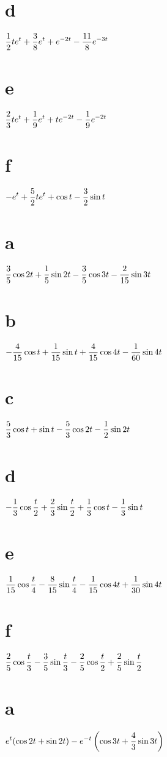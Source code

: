 \part{d}  $\displaystyle{\frac{1}{2}te^t+\frac{3}{8}e^t+e^{-2t}
-\frac{11}{8}e^{-3t}}$
\part{e}  $\displaystyle{\frac{2}{3}te^t+\frac{1}{9}e^t
+te^{-2t}-\frac{1}{9}e^{-2t}}$
\part{f}
$\displaystyle{-e^t+\frac{5}{2}te^t+\cos t-\frac{3}{2}\sin t}$

\;
 \part{a} $\displaystyle{\frac{3}{5}\cos 2t+\frac{1}{5}\sin 2t
-\frac{3}{5}\cos 3t-\frac{2}{15}\sin 3t}$\;
\part{b} $\displaystyle{-\frac{4}{15}\cos t+\frac{1}{15}\sin t
+\frac{4}{15}\cos 4t-\frac{1}{60}\sin 4t}$\;
\part{c} $\displaystyle{\frac{5}{3}\cos t+\sin t-\frac{5}{3}
\cos 2t-\frac{1}{2}\sin 2t}$\;
\part{d} $\displaystyle{-\frac{1}{3}\cos\frac{t}{2}+\frac{2}{3}
\sin\frac{t}{2}+\frac{1}{3}\cos t-\frac{1}{3}\sin t}$\;
\part{e}
$\displaystyle{\frac{1}{15}\cos\frac{t}{4}-\frac{8}{15}\sin\frac{t}{4} -\frac{1}{15}\cos 4t+\frac{1}{30}\sin4t}$\;
\part{f}
$\displaystyle{\frac{2}{5}\cos\frac{t}{3}-\frac{3}{5}\sin\frac{t}{3}
-\frac{2}{5}\cos\frac{t}{2}+\frac{2}{5}\sin\frac{t}{2}}$

\;
\part{a} $\displaystyle{e^t(\cos 2t+\sin 2t)-e^{-t}\left(\cos
3t+\frac{4}{3}\sin 3t\right)}$\;
